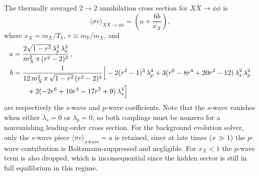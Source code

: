 \documentclass[11pt]{article}
\numberwithin{equation}{section}
\newcommand{\sigmav}{\langle\sigma v\rangle}
\newcommand{\TD}{T_h}
\newcommand{\mX}{m_X}
\newcommand{\mY}{m_Y}
\begin{document}
The thermally averaged $2\to2$ annihilation cross section for $X\bar{X}\to\phi\phi$ is
\begin{equation}
    \sigmav_{X\bar{X}\to\phi\phi} = \!\left(a + \frac{6b}{x_X}\right),
\end{equation}
where $x_X = \mX/\TD$, $r \equiv \mY/\mX$, and
\begin{align}
    a &= \frac{2\sqrt{1-r^2}\,\lambda_p^2\,\lambda_s^2}{\mX^2\,\pi\,(r^2 - 2)^2}\,, \label{eq:HP_swave} \\
    b &= \frac{1}{12\,\mX^2\,\pi\,\sqrt{1-r^2}\,(r^2-2)^4}\Big[
    -2(r^2-1)^3\,\lambda_p^4
    + 3(r^6 - 8r^4 + 20r^2 - 12)\,\lambda_s^2\,\lambda_p^2 \notag \\
    &\qquad + 2(-2r^6 + 10r^4 - 17r^2 + 9)\,\lambda_s^4\Big] \label{eq:HP_pwave}
\end{align}
are respectively the $s$-wave and $p$-wave coefficients. Note that the $s$-wave vanishes when either $\lambda_s = 0$ or $\lambda_p = 0$, so both couplings must be nonzero for a nonvanishing leading-order cross section. For the background evolution solver, only the $s$-wave piece $\sigmav_{\text{s-wave}} = a$ is retained, since at late times ($x \gg 1$) the $p$-wave contribution is Boltzmann-suppressed and negligible. For $x_X < 1$ the $p$-wave term is also dropped, which is inconsequential since the hidden sector is still in full equilibrium in this regime.
\end{document}
